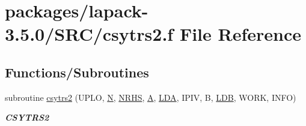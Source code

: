\hypertarget{csytrs2_8f}{}\section{packages/lapack-\/3.5.0/\+S\+R\+C/csytrs2.f File Reference}
\label{csytrs2_8f}
\subsection*{Functions/\+Subroutines}
\begin{DoxyCompactItemize}
\item 
subroutine \hyperlink{group__complexSYcomputational_ga83c04c706f23cb68b4243cf7a40db229}{csytrs2} (U\+P\+L\+O, \hyperlink{polmisc_8c_a0240ac851181b84ac374872dc5434ee4}{N}, \hyperlink{example__user_8c_aa0138da002ce2a90360df2f521eb3198}{N\+R\+H\+S}, \hyperlink{classA}{A}, \hyperlink{example__user_8c_ae946da542ce0db94dced19b2ecefd1aa}{L\+D\+A}, I\+P\+I\+V, B, \hyperlink{example__user_8c_a50e90a7104df172b5a89a06c47fcca04}{L\+D\+B}, W\+O\+R\+K, I\+N\+F\+O)
\begin{DoxyCompactList}\small\item\em {\bfseries C\+S\+Y\+T\+R\+S2} \end{DoxyCompactList}\end{DoxyCompactItemize}
